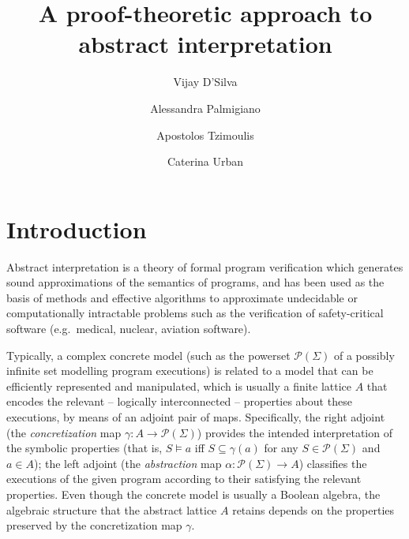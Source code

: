 \documentclass[11pt]{article}
\title{A proof-theoretic approach to abstract interpretation}
\date{}
\author[1]{Vijay D'Silva}
\author[2,3]{Alessandra Palmigiano}
\author[4]{Apostolos Tzimoulis}
\author[5]{Caterina Urban}
\affil[1]{Google Inc., San Francisco}
\affil[2]{Vrije Universiteit Amsterdam, The Netherlands}
\affil[3]{University of Johannesburg, South Africa}
\affil[4]{University of Luxembourg, Luxembourg}
\affil[5]{INRIA, France}
\theoremstyle{plain}
\theoremstyle{definition}
\begin{document}
\maketitle

\section{Introduction}

Abstract interpretation is a theory of formal program verification which generates sound approximations of the semantics of programs, and %
 has been used as the basis of methods and effective algorithms to approximate undecidable or computationally intractable problems such as the verification of safety-critical software (e.g.~medical, nuclear, aviation software).

Typically,  a complex concrete model (such as the powerset $\mathcal{P}(\Sigma)$ of a possibly infinite set modelling program executions) is related to a model that can be efficiently represented and manipulated, which is usually a finite lattice $A$ that encodes the relevant -- logically interconnected -- properties about these executions, by means of an adjoint pair of maps. Specifically, the right adjoint (the {\em concretization} map $\gamma: A\to \mathcal{P}(\Sigma)$)  provides the intended interpretation of the symbolic properties (that is, $S\models a$ iff $S\subseteq \gamma(a)$ for any $S\in \mathcal{P}(\Sigma)$ and  $a\in A$); the left adjoint (the {\em abstraction} map $\alpha: \mathcal{P}(\Sigma)\to A$) classifies the executions of the given program according to their satisfying the relevant properties. Even though the concrete model is usually a Boolean algebra, the algebraic structure that the abstract lattice $A$ retains depends on the properties preserved by the concretization map $\gamma$.    %


\end{document}

